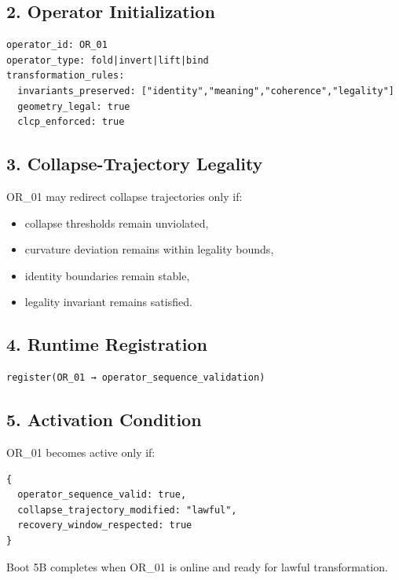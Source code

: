 \subsection*{2. Operator Initialization}

\begin{verbatim}
operator_id: OR_01
operator_type: fold|invert|lift|bind
transformation_rules:
  invariants_preserved: ["identity","meaning","coherence","legality"]
  geometry_legal: true
  clcp_enforced: true
\end{verbatim}

\subsection*{3. Collapse-Trajectory Legality}

OR\_01 may redirect collapse trajectories only if:

\begin{itemize}[leftmargin=1.2cm]
    \item collapse thresholds remain unviolated,
    \item curvature deviation remains within legality bounds,
    \item identity boundaries remain stable,
    \item legality invariant remains satisfied.
\end{itemize}

\subsection*{4. Runtime Registration}

\begin{verbatim}
register(OR_01 → operator_sequence_validation)
\end{verbatim}

\subsection*{5. Activation Condition}

OR\_01 becomes active only if:

\begin{verbatim}
{
  operator_sequence_valid: true,
  collapse_trajectory_modified: "lawful",
  recovery_window_respected: true
}
\end{verbatim}




\medskip
\noindent
Boot 5B completes when OR\_01 is online and ready for lawful transformation.


